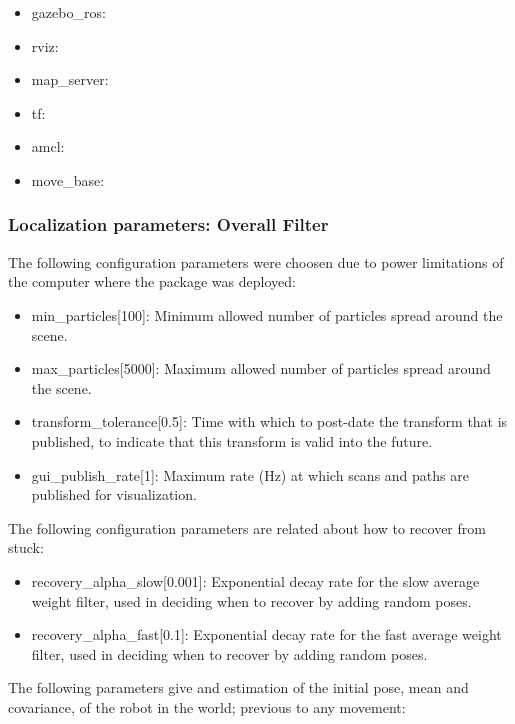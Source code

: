 \documentclass[10pt,journal,compsoc]{IEEEtran}
\begin{document}
\begin{itemize}
\item gazebo\_ros:
\item rviz:
\item map\_server:
\item tf:
\item amcl:
\item move\_base: 
\end{itemize}

\subsubsection{Localization parameters: Overall Filter}

The following configuration parameters were choosen due to power limitations of the computer where the package was deployed:

\begin{itemize}
\item min\_particles[100]: Minimum allowed number of particles spread around the scene.
\item max\_particles[5000]: Maximum allowed number of particles spread around the scene. 
\item transform\_tolerance[0.5]: Time with which to post-date the transform that is published, to indicate that this transform is valid into the future.
\item gui\_publish\_rate[1]: Maximum rate (Hz) at which scans and paths are published for visualization.
\end{itemize}

The following configuration parameters are related about how to recover from stuck:

\begin{itemize}
\item recovery\_alpha\_slow[0.001]: Exponential decay rate for the slow average weight filter, used in deciding when to recover by adding random poses.   
\item recovery\_alpha\_fast[0.1]: Exponential decay rate for the fast average weight filter, 
used in deciding when to recover by adding random poses.
\end{itemize}

The following parameters give and estimation of the initial pose, mean and covariance, of the robot in the world; previous to any movement:
\end{document}
